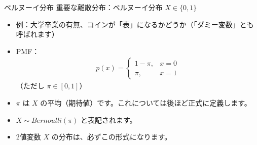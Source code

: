 \documentclass[11pt,handout]{beamer}
\begin{document}
\begin{frame}{ベルヌーイ分布}
\vspace{0.1cm}
重要な離散分布：ベルヌーイ分布 $X\in\{0,1\}$\pause{}

\begin{itemize}
\item 例：大学卒業の有無、コインが「表」になるかどうか（「ダミー変数」とも呼ばれます）
\vspace{0.1cm}\pause{}
\item PMF：
\vspace{-0.4cm}
\begin{align*}
p(x)=
\begin{cases}
1-\pi, & x=0\\
\pi, & x=1
\end{cases}
\end{align*}
（ただし $\pi\in[0,1]$）
\vspace{0.1cm}\pause
\item $\pi$ は $X$ の平均（期待値）です。これについては後ほど正式に定義します。
\vspace{0.1cm}\pause{}
\item $X\sim Bernoulli(\pi)$ と表記されます。
\vspace{0.1cm}\pause{}
\item 2値変数 $X$ の分布は、必ずこの形式になります。
\end{itemize}

\end{frame}
\end{document}
